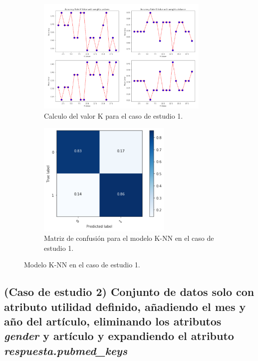 \begin{figure}[!htb]
    \begin{subfigure}[b]{0.45\linewidth}
    	\centering
	    \includegraphics[width=0.9\textwidth]{images/resultados_knn_ent_conjunto1.png}
    	\caption{Calculo del valor K para el caso de estudio 1.}
		\label{knnTrainCase1}
	\end{subfigure}
	\begin{subfigure}[b]{0.45\linewidth} 
		\centering
		\includegraphics[width=0.7\textwidth]{images/resultados_knn_cm_conjunto1.png}
		\caption{Matriz de confusión para el modelo K-NN en el caso de estudio 1.}
		\label{knnCMCase1}
	\end{subfigure}
	\caption{Modelo K-NN en el caso de estudio 1.}
	\label{knnCase1}
\end{figure}

\subsection{(Caso de estudio 2) Conjunto de datos solo con atributo utilidad definido, añadiendo el mes y año del artículo, eliminando los atributos \textit{gender} y artículo y expandiendo el atributo \textit{respuesta.pubmed\_keys}}


